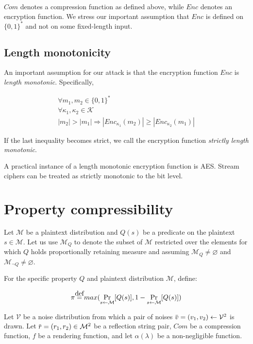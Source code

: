 \documentclass{sig-alternate-05-2015}
\let\emptyset\varnothing
\newcommand\defeq{\stackrel{\mathclap{\normalfont\mbox{def}}}{=}}
\newcommand{\overbar}[1]{\mkern 1.5mu\overline{\mkern-1.5mu#1\mkern-1.5mu}\mkern 1.5mu}
\begin{document}
$Com$ denotes a compression function as defined above, while $Enc$ denotes an
encryption function. We stress our important assumption that $Enc$ is defined
on $\{0, 1\}^*$ and not on some fixed-length input.

\subsection{Length monotonicity}\label{subsec:lenmonotone}

An important assumption for our attack is that the encryption function $Enc$ is
\textit{length monotonic}. Specifically,

\begin{equation*}
\begin{split}
\forall m_1, m_2 \in \{0, 1\}^*\\
\forall \kappa_1, \kappa_2 \in \mathcal{K}\\
|m_2| > |m_1|
\Rightarrow
|Enc_{\kappa_1}(m_2)| \geq |Enc_{\kappa_2}(m_1)|
\end{split}
\end{equation*}

If the last inequality becomes strict, we call the encryption function
\textit{strictly length monotonic}.

A practical instance of a length monotonic encryption function is AES.
Stream ciphers can be treated as strictly monotonic to the bit level.

\section{Property compressibility}\label{sec:propertycom}

Let $\mathcal{M}$ be a plaintext distribution and $Q(s)$ be a predicate on the
plaintext $s \in \mathcal{M}$. Let us use $\mathcal{M}_Q$ to denote the subset
of $\mathcal{M}$ restricted over the elements for which $Q$ holds
proportionally retaining measure and assuming $\mathcal{M}_Q \neq \emptyset$
and $\mathcal{M}_{\lnot Q} \neq \emptyset$.

For the specific property $Q$ and plaintext distribution $\mathcal{M}$, define:

\begin{equation*}
    \pi \defeq max(\Pr_{s \leftarrow \mathcal{M}}[Q(s)], 1 - \Pr_{s \leftarrow \mathcal{M}}[Q(s)])
\end{equation*}

Let $\mathcal{V}$ be a noise distribution from which a pair of noises
$\overbar{v} = (v_1, v_2) \leftarrow \mathcal{V}^2$ is drawn.  Let $\overbar{r}
= (r_1, r_2) \in \mathcal{M}^2$ be a reflection string pair, $Com$ be a
compression function, $f$ be a rendering function, and let $\alpha(\lambda)$ be
a non-negligible function.
\end{document}

